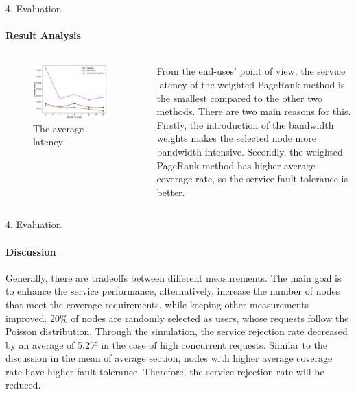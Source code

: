 \documentclass{beamer}		%
\begin{document}
\begin{frame}{4. Evaluation}
\framesubtitle{Result Analysis}
\begin{columns}
\begin{figure}
    \centering
    \includegraphics[width=0.9\textwidth]{imgs/Figure7.png}
    \caption{The average latency}
\end{figure}
From the end-uses’ point of view, the service latency of the weighted PageRank method is the smallest compared to the other two methods. There are two main reasons for this. Firstly, the introduction of the bandwidth weights makes the selected node more bandwidth-intensive. Secondly, the weighted PageRank method has higher average coverage rate, so the service fault tolerance is better.
\end{columns}
\end{frame}

\begin{frame}{4. Evaluation}
\framesubtitle{Discussion}
Generally, there are tradeoffs between different measurements. The main goal is to enhance the service performance, alternatively, increase the number of nodes that meet the coverage requirements, while keeping other measurements improved. 20\% of nodes are randomly selected as users, whose requests follow the Poisson distribution. Through the simulation, the service rejection rate decreased by an average of 5.2\% in the case of high concurrent requests. Similar to the discussion in the mean of average section, nodes with higher average coverage rate have higher fault tolerance. Therefore, the service rejection rate will be reduced.
\end{frame}
\end{document}
